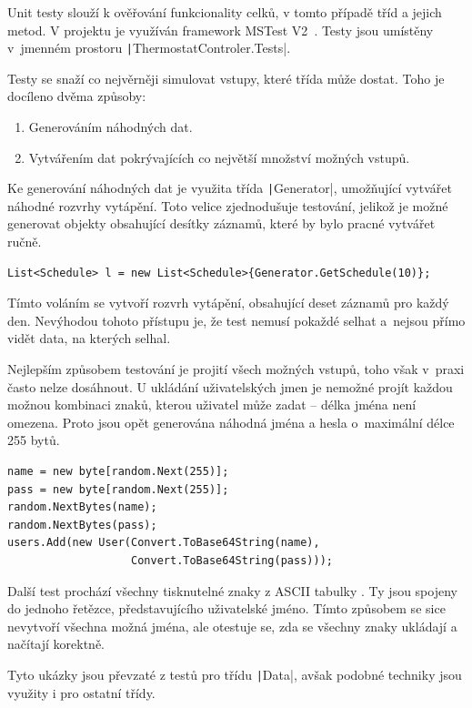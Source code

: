 \documentclass[thesis=B,czech]{FITthesis}[2012/10/20]
\begin{document}
Unit testy slouží k ověřování funkcionality celků, v tomto případě tříd a jejich metod. V projektu je využíván framework MSTest V2~\cite{mstest}. Testy jsou umístěny v~jmenném prostoru  \texttt|ThermostatControler.Tests|.

Testy se snaží co nejvěrněji simulovat vstupy, které třída může dostat. Toho je docíleno dvěma způsoby:

\begin{enumerate}
	\item Generováním náhodných dat.
	\item Vytvářením dat pokrývajících co největší množství možných vstupů.
\end{enumerate}

Ke generování náhodných dat je využita třída \texttt|Generator|, umožňující vytvářet náhodné rozvrhy vytápění. Toto velice zjednodušuje testování, jelikož je možné generovat objekty obsahující desítky záznamů, které by bylo pracné vytvářet ručně. 

\begin{verbatim}
List<Schedule> l = new List<Schedule>{Generator.GetSchedule(10)};
\end{verbatim}

Tímto voláním se vytvoří rozvrh vytápění, obsahující deset záznamů pro každý den. Nevýhodou tohoto přístupu je, že test nemusí pokaždé selhat a~nejsou přímo vidět data, na kterých selhal.

Nejlepším způsobem testování je projití všech možných vstupů, toho však v~pra\-xi často nelze dosáhnout. U ukládání uživatelských jmen je nemožné projít každou možnou kombinaci znaků, kterou uživatel může zadat -- délka jména není omezena. Proto jsou opět generována náhodná jména a hesla o~maximální délce 255 bytů.

\begin{verbatim}
name = new byte[random.Next(255)];
pass = new byte[random.Next(255)];
random.NextBytes(name);
random.NextBytes(pass);
users.Add(new User(Convert.ToBase64String(name),
                   Convert.ToBase64String(pass)));
\end{verbatim}

Další test prochází všechny tisknutelné znaky z ASCII tabulky \cite{ascii}. Ty jsou spojeny do jednoho řetězce, představujícího uživatelské jméno. Tímto způsobem se sice nevytvoří všechna možná jména, ale otestuje se, zda se všechny znaky ukládají a načítají korektně.

Tyto ukázky jsou převzaté z testů pro třídu \texttt|Data|, avšak podobné techniky jsou využity i pro ostatní třídy.
\end{document}
